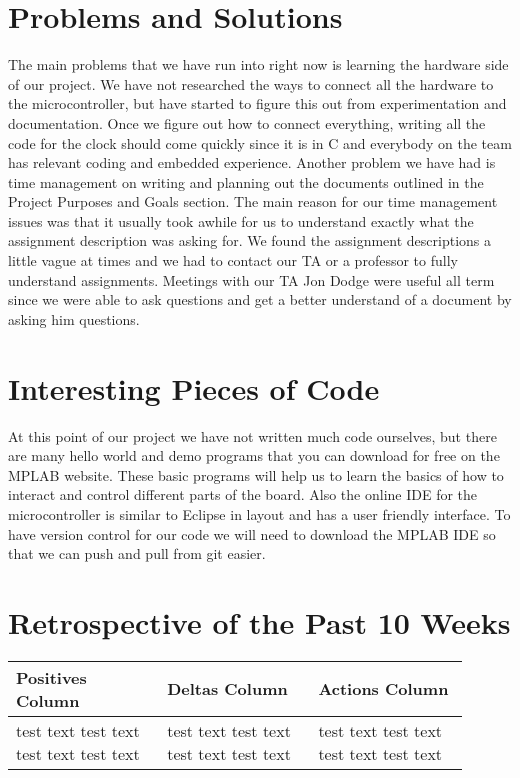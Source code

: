 \documentclass[10pt,draftclsnofoot,onecolumn]{IEEEtran}
\begin{document}
\section{Problems and Solutions}
The main problems that we have run into right now is learning the hardware side of our project.
We have not researched the ways to connect all the hardware to the microcontroller, but have started to figure this out from experimentation and documentation.
Once we figure out how to connect everything, writing all the code for the clock should come quickly since it is in C and everybody on the team has relevant coding and embedded experience.
Another problem we have had is time management on writing and planning out the documents outlined in the Project Purposes and Goals section. 
The main reason for our time management issues was that it usually took awhile for us to understand exactly what the assignment description was asking for.
We found the assignment descriptions a little vague at times and we had to contact our TA or a professor to fully understand assignments.
Meetings with our TA Jon Dodge were useful all term since we were able to ask questions and get a better understand of a document by asking him questions.

\section{Interesting Pieces of Code}
At this point of our project we have not written much code ourselves, but there are many hello world and demo programs that you can download for free on the MPLAB website.
These basic programs will help us to learn the basics of how to interact and control different parts of the board. 
Also the online IDE for the microcontroller is similar to Eclipse in layout and has a user friendly interface. 
To have version control for our code we will need to download the MPLAB IDE so that we can push and pull from git easier. 

\section{Retrospective of the Past 10 Weeks}
\begin{center}
\begin{tabular}{| p{0.3\linewidth} | p{0.3\linewidth} | p{0.3\linewidth} |}
\hline
Positives Column & 
Deltas Column & 
Actions Column \\
\hline
test text test text test text test text &
test text test text test text test text &
test text test text test text test text \\
\hline
\end{tabular}
\end{center}
\end{document}
